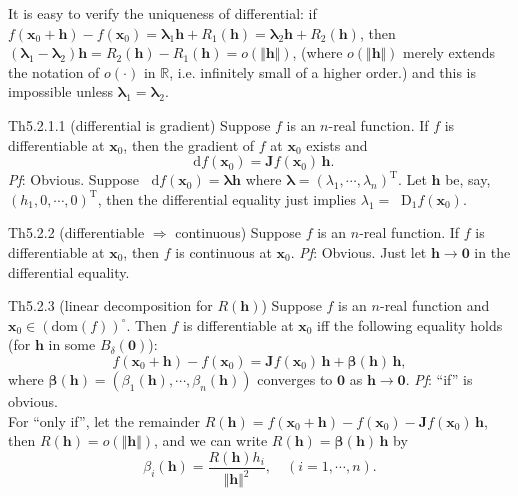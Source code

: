 \documentclass{article}
\newcommand{\dif}{\mathop{}\!\mathrm{d}}
\newcommand{\Dif}{\mathop{}\!\mathrm{D}}
\begin{document}
\begin{Rmk}{}
    It is easy to verify \textcolor{Th}{the uniqueness of differential:} if $f(\pmb{x}_0 + \pmb{h}) - f(\pmb{x}_0) = \pmb{\lambda}_1\pmb{h} + R_1(\pmb{h}) = \pmb{\lambda}_2\pmb{h} + R_2(\pmb{h})$, then $(\pmb{\lambda}_1 - \pmb{\lambda}_2)\pmb{h} = R_2(\pmb{h}) - R_1(\pmb{h}) = o(\Vert \pmb{h}\Vert)$, (\textcolor{Df}{where $o(\Vert \pmb{h}\Vert)$ merely extends the notation of $o(\cdot)$ in $\mathbb{R}$, i.e. infinitely small of a higher order.}) and this is impossible unless $\pmb{\lambda}_1 = \pmb{\lambda}_2$.
\end{Rmk}

\begin{Th}{Th5.2.1.1 (differential is gradient)}
    Suppose $f$ is an $n$-real function. If $f$ is differentiable at $\pmb{x}_0$, then the gradient of $f$ at $\pmb{x}_0$ exists and
    $$\dif f(\pmb{x}_0) = \pmb{J}f(\pmb{x}_0)\,\pmb{h}.$$
    \tcblower
    \textit{Pf}: Obvious. Suppose $\dif f(\pmb{x}_0) = \pmb{\lambda h}$ where $\pmb{\lambda} = (\lambda_1, \cdots, \lambda_n)^\mathrm{T}$. Let $\pmb{h}$ be, say, $(h_1, 0, \cdots, 0)^\mathrm{T}$, then the differential equality just implies $\lambda_1 = \Dif_1 f(\pmb{x}_0)$.
\end{Th}

\begin{Th}{Th5.2.2 (differentiable $\Rightarrow$ continuous)}
    Suppose $f$ is an $n$-real function. If $f$ is differentiable at $\pmb{x}_0$, then $f$ is continuous at $\pmb{x}_0$.
    \tcblower
    \textit{Pf}: Obvious. Just let $\pmb{h}\rightarrow \pmb{0}$ in the differential equality.
\end{Th}

\begin{Th}{Th5.2.3 (linear decomposition for $R(\pmb{h})$)}
    Suppose $f$ is an $n$-real function and $\pmb{x}_0\in (\text{dom}(f))^\circ$. Then $f$ is differentiable at $\pmb{x}_0$ iff the following equality holds (for $\pmb{h}$ in some $B_\delta(\pmb{0})$):
    $$ f(\pmb{x}_0 + \pmb{h}) - f(\pmb{x}_0) = \pmb{J}f(\pmb{x}_0)\,\pmb{h} + \pmb{\beta}(\pmb{h})\,\pmb{h}, $$
    where $\pmb{\beta}(\pmb{h}) = (\beta_1(\pmb{h}), \cdots, \beta_n(\pmb{h}))$ converges to $\pmb{0}$ as $\pmb{h}\rightarrow \pmb{0}$.
    \tcblower
    \textit{Pf}: ``if'' is obvious. \\
    For ``only if'', let the remainder $R(\pmb{h}) = f(\pmb{x}_0 + \pmb{h}) - f(\pmb{x}_0) - \pmb{J}f(\pmb{x}_0)\,\pmb{h}$, then $R(\pmb{h}) = o(\Vert \pmb{h}\Vert)$, and we can write $R(\pmb{h}) = \pmb{\beta}(\pmb{h})\,\pmb{h}$ by
    $$\beta_i(\pmb{h}) = \frac{R(\pmb{h})h_i}{\Vert \pmb{h}\Vert^2}, \quad (i=1,\cdots,n).$$
\end{Th}
\end{document}
